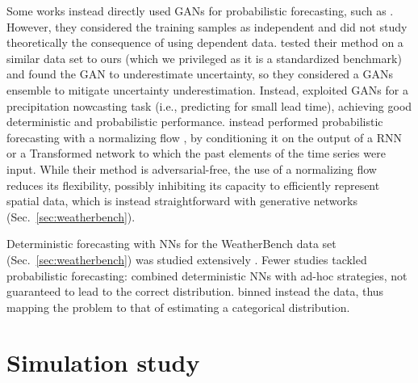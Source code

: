 \documentclass[twoside,11pt]{article}
\begin{document}
	
	Some works instead directly used GANs for probabilistic forecasting, such as  \cite{kwon2019predicting, koochali2021, bihlo2021generative, ravuri2021skillful}. However, they considered the training samples as independent and did not study theoretically the consequence of using dependent data. \citet{bihlo2021generative} tested their method on a similar data set to ours (which we privileged as it is a standardized benchmark) and found the GAN to underestimate uncertainty, so they considered a GANs ensemble to mitigate uncertainty underestimation. Instead, \citet{ravuri2021skillful} exploited GANs for a precipitation {nowcasting} task (i.e., predicting for small lead time), achieving good deterministic and probabilistic performance. 
	\cite{rasul2021multivariate} instead performed probabilistic forecasting with a normalizing flow \citep{papamakarios2019normalizing}, by conditioning it on the output of a RNN or a Transformed network \citep{vaswani2017attention} to which the past elements of the time series were input. While their method is adversarial-free, the use of a normalizing flow reduces its flexibility, possibly inhibiting its capacity to efficiently represent spatial data, which is instead straightforward with generative networks (Sec.~\ref{sec:weatherbench}).
	
	
	Deterministic forecasting with NNs for the WeatherBench data set (Sec.~\ref{sec:weatherbench}) was studied extensively \cite{dueben2018challenges,scher2018toward, scher2019weather, weyn2019can}. Fewer studies tackled probabilistic forecasting: \citet{scher2021ensemble} combined deterministic NNs with ad-hoc strategies, not guaranteed to lead to the correct distribution. \citet{clare2021combining} binned instead the data, thus mapping the problem to that of estimating a categorical distribution.
	
	
	
	
	
	
	
	
	
	
	
	
	
	
	
	
	
	\section{Simulation study}\label{sec:simulations}
	
	
	
\end{document}

